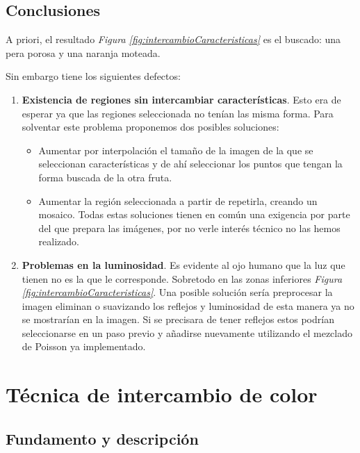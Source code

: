 \documentclass[11pt,twoside,titlepage,a4paper]{article}
\numberwithin{equation}{section} %
\theoremstyle{usual}
\begin{document}
\subsection{Conclusiones}

A priori, el resultado \textit{Figura \ref{fig:intercambioCaracteristicas}} es el buscado: una pera porosa y una naranja moteada.   

Sin embargo tiene los siguientes defectos: 

\begin{enumerate}
    \item \textbf{Existencia de regiones sin intercambiar características}. Esto era de esperar ya que las regiones seleccionada no tenían las misma forma. Para solventar este problema proponemos dos posibles soluciones:
    \begin{itemize}
        \item Aumentar por interpolación el tamaño de la imagen de la que se seleccionan características  y de ahí seleccionar los puntos que tengan la forma buscada de la otra fruta.
        \item Aumentar la región seleccionada a partir de repetirla, creando un mosaico.   
    Todas estas soluciones tienen en común una exigencia por parte del que prepara las imágenes, por no verle interés técnico no las hemos realizado.
    \end{itemize}
    \item \textbf{Problemas en la luminosidad}. Es evidente al ojo humano que la luz que tienen no es la que le corresponde. Sobretodo en las zonas inferiores \textit{Figura \ref{fig:intercambioCaracteristicas}}. Una posible solución sería preprocesar la imagen eliminan o suavizando los reflejos y luminosidad de esta manera ya no se mostrarían en la imagen. Si se precisara de tener reflejos estos podrían seleccionarse en un paso previo y añadirse nuevamente  utilizando el mezclado de Poisson ya implementado.
\end{enumerate}

\newpage

\section{Técnica de intercambio de color}

\subsection{Fundamento y descripción}
\end{document}
